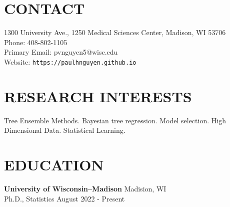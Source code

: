 \documentclass[margin]{res}
\begin{document}
  
                        
\begin{resume}                        
  
  \section{CONTACT} 
  1300 University Ave., 1250 Medical Sciences Center, Madison, WI 53706 \\
  Phone: 408-802-1105 \\ 
  Primary Email: pvnguyen5@wisc.edu \\
  Website: \texttt{https://paulhnguyen.github.io}

  \section{RESEARCH INTERESTS}
  Tree Ensemble Methods. Bayesian tree regression. Model selection. High Dimensional Data. Statistical Learning.
              


              
\section{EDUCATION}      
                {\bf University of Wisconsin--Madison} \hfill Madision, WI \\
                Ph.D., Statistics \hfill August 2022 - Present \\
                

\end{resume}
\end{document}
